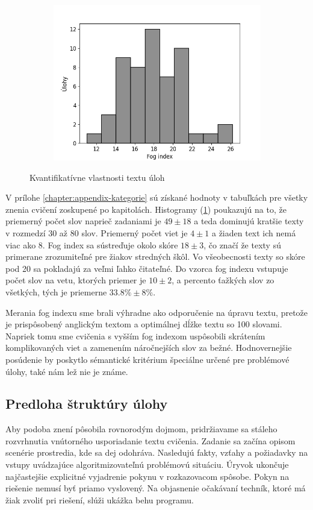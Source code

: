\begin{figure}[h]
\begin{subfigure}[b]{0.32\textwidth}
\includegraphics[width=\textwidth]{assets/fog.png}
\end{subfigure}
\hfill
\caption{Kvantifikatívne vlastnosti textu úloh}
\label{fig:text-metrics}
\end{figure}

V prílohe \ref{chapter:appendix-kategorie} sú získané hodnoty v tabuľkách pre všetky znenia cvičení zoskupené po kapitolách. Histogramy (\ref{fig:text-metrics}) poukazujú na to, že priemerný počet slov naprieč zadaniami je $49 \pm 18$ a teda dominujú kratšie texty v rozmedzí $30$ až $80$ slov. Priemerný počet viet je $4 \pm 1$ a žiaden text ich nemá viac ako $8$. Fog index sa sústreďuje okolo skóre $18 \pm 3$, čo značí že texty sú primerane zrozumiteľné pre žiakov stredných škôl. Vo všeobecnosti texty so skóre pod 20 sa pokladajú za veľmi ľahko čitateľné. Do vzorca fog indexu vstupuje počet slov na vetu, ktorých priemer je $10 \pm 2$, a percento ťažkých slov zo všetkých, tých je priemerne $33.8\% \pm 8\%$.

Merania fog indexu sme brali výhradne ako odporučenie na úpravu textu, pretože je prispôsobený anglickým textom a optimálnej dĺžke textu so 100 slovami. Napriek tomu sme cvičenia s vyšším fog indexom uspôsobili skrátením komplikovaných viet a zamenením náročnejších slov za bežné. Hodnovernejšie posúdenie by poskytlo sémantické kritérium špeciálne určené pre problémové úlohy, také nám lež nie je známe.

\subsection{Predloha štruktúry úlohy}
Aby podoba znení pôsobila rovnorodým dojmom, pridržiavame sa stáleho rozvrhnutia vnútorného usporiadanie textu cvičenia. Zadanie sa začína opisom scenérie prostredia, kde sa dej odohráva. Nasledujú fakty, vzťahy a požiadavky na vstupy uvádzajúce algoritmizovateľnú problémovú situáciu. Úryvok ukončuje najčastejšie explicitné vyjadrenie pokynu v rozkazovacom spôsobe. Pokyn na riešenie nemusí byť priamo vyslovený. Na objasnenie očakávaní techník, ktoré má žiak zvoliť pri riešení, slúži ukážka behu programu.

